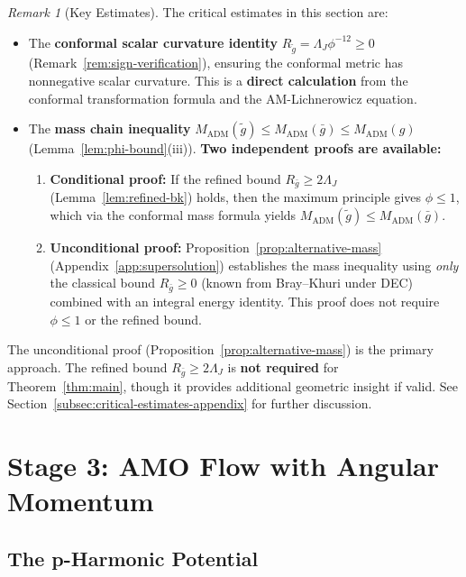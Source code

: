 \documentclass[12pt]{article}
\theoremstyle{plain}
\theoremstyle{definition}
\theoremstyle{remark}
\newtheorem{remark}[theorem]{Remark}
\newcommand{\ADM}{\mathrm{ADM}}
\newcommand{\tg}{\tilde{g}}
\newcommand{\bg}{\bar{g}}
\begin{document}
\begin{remark}[Key Estimates]\label{rem:verification-lich}
The critical estimates in this section are:
\begin{itemize}
    \item The \textbf{conformal scalar curvature identity} $R_{\tg} = \Lambda_J \phi^{-12} \geq 0$ (Remark~\ref{rem:sign-verification}), ensuring the conformal metric has nonnegative scalar curvature. This is a \textbf{direct calculation} from the conformal transformation formula and the AM-Lichnerowicz equation.
    \item The \textbf{mass chain inequality} $M_{\ADM}(\tg) \leq M_{\ADM}(\bg) \leq M_{\ADM}(g)$ (Lemma~\ref{lem:phi-bound}(iii)). \textbf{Two independent proofs are available:}
    \begin{enumerate}[label=(\alph*)]
    \item \textbf{Conditional proof:} If the refined bound $R_{\bg} \geq 2\Lambda_J$ (Lemma~\ref{lem:refined-bk}) holds, then the maximum principle gives $\phi \leq 1$, which via the conformal mass formula yields $M_{\ADM}(\tg) \leq M_{\ADM}(\bg)$.
    \item \textbf{Unconditional proof:} Proposition~\ref{prop:alternative-mass} (Appendix~\ref{app:supersolution}) establishes the mass inequality using \emph{only} the classical bound $R_{\bg} \geq 0$ (known from Bray--Khuri under DEC) combined with an integral energy identity. This proof does not require $\phi \leq 1$ or the refined bound.
    \end{enumerate}
\end{itemize}
The unconditional proof (Proposition~\ref{prop:alternative-mass}) is the primary approach. The refined bound $R_{\bg} \geq 2\Lambda_J$ is \textbf{not required} for Theorem~\ref{thm:main}, though it provides additional geometric insight if valid. See Section~\ref{subsec:critical-estimates-appendix} for further discussion.
\end{remark}

\section{Stage 3: AMO Flow with Angular Momentum}\label{sec:amo}

\subsection{The p-Harmonic Potential}
\end{document}
